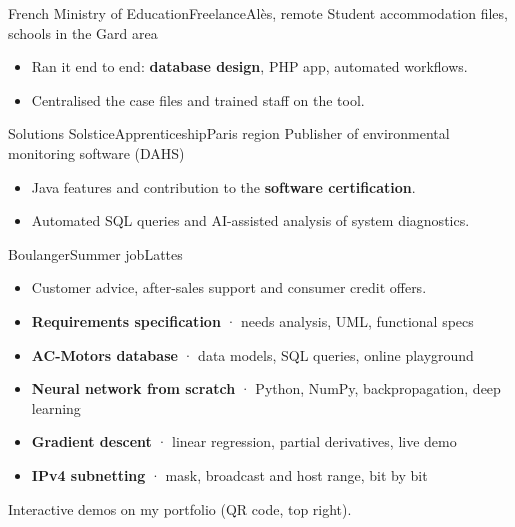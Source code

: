 \begin{minipage}[t]{\mainwidth}
  {French Ministry of Education}{Freelance}{Alès, remote}
  {Student accommodation files, schools in the Gard area}
\begin{itemize}
  \item Ran it end to end: \textbf{database design}, PHP app, automated workflows.
  \item Centralised the case files and trained staff on the tool.
\end{itemize}

  {Solutions Solstice}{Apprenticeship}{Paris region}
  {Publisher of environmental monitoring software (DAHS)}
\begin{itemize}
  \item Java features and contribution to the \textbf{software certification}.
  \item Automated SQL queries and AI-assisted analysis of system diagnostics.
\end{itemize}

  {Boulanger}{Summer job}{Lattes}{}
\begin{itemize}
  \item Customer advice, after-sales support and consumer credit offers.
\end{itemize}

\begin{itemize}[itemsep=1pt]
  \item \textbf{Requirements specification} {\color{muted}· needs analysis, UML, functional specs}
  \item \textbf{AC-Motors database} {\color{muted}· data models, SQL queries, online playground}
  \item \textbf{Neural network from scratch} {\color{muted}· Python, NumPy, backpropagation, deep learning}
  \item \textbf{Gradient descent} {\color{muted}· linear regression, partial derivatives, live demo}
  \item \textbf{IPv4 subnetting} {\color{muted}· mask, broadcast and host range, bit by bit}
\end{itemize}
{\small\color{muted}Interactive demos on my portfolio (QR code, top right).}

\end{minipage}%
\hfill%
